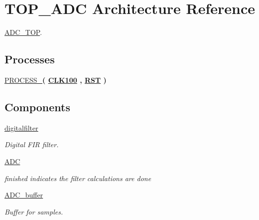 \hypertarget{classADC__TOP_1_1TOP__ADC}{\section{T\-O\-P\-\_\-\-A\-D\-C Architecture Reference}
\label{classADC__TOP_1_1TOP__ADC}
}


\hyperlink{classADC__TOP}{A\-D\-C\-\_\-\-T\-O\-P}.  


\subsection*{Processes}
 \begin{DoxyCompactItemize}
\item 
\hypertarget{classADC__TOP_1_1TOP__ADC_af7530dff761625dab17b84e8c5926692}{\hyperlink{classADC__TOP_1_1TOP__ADC_af7530dff761625dab17b84e8c5926692}{P\-R\-O\-C\-E\-S\-S\-\_}{\bfseries  ( {\bfseries {\bfseries \hyperlink{classADC__TOP_ab1f7becce7cb29d94bb2f2ec187f72a4}{C\-L\-K100}} \textcolor{vhdlchar}{ }\textcolor{vhdlchar}{ }\textcolor{vhdlchar}{ }} , {\bfseries {\bfseries \hyperlink{classADC__TOP_a91cf794d165cc0a740042335a6062940}{R\-S\-T}} \textcolor{vhdlchar}{ }} )}}\label{classADC__TOP_1_1TOP__ADC_af7530dff761625dab17b84e8c5926692}

\end{DoxyCompactItemize}
\subsection*{Components}
 \begin{DoxyCompactItemize}
\item 
\hypertarget{classADC__TOP_1_1TOP__ADC_ae43da35f6da7738b69d6245cc2ca3b49}{\hyperlink{classADC__TOP_1_1TOP__ADC_ae43da35f6da7738b69d6245cc2ca3b49}{digitalfilter}  {\bfseries }  }\label{classADC__TOP_1_1TOP__ADC_ae43da35f6da7738b69d6245cc2ca3b49}

\begin{DoxyCompactList}\small\item\em Digital F\-I\-R filter. \end{DoxyCompactList}\item 
\hypertarget{classADC__TOP_1_1TOP__ADC_ad251174263b28388454816799ffd91ae}{\hyperlink{classADC__TOP_1_1TOP__ADC_ad251174263b28388454816799ffd91ae}{A\-D\-C}  {\bfseries }  }\label{classADC__TOP_1_1TOP__ADC_ad251174263b28388454816799ffd91ae}

\begin{DoxyCompactList}\small\item\em finished indicates the filter calculations are done \end{DoxyCompactList}\item 
\hypertarget{classADC__TOP_1_1TOP__ADC_a76d32257e982d92a96905d3f9b3babc8}{\hyperlink{classADC__TOP_1_1TOP__ADC_a76d32257e982d92a96905d3f9b3babc8}{A\-D\-C\-\_\-buffer}  {\bfseries }  }\label{classADC__TOP_1_1TOP__ADC_a76d32257e982d92a96905d3f9b3babc8}

\begin{DoxyCompactList}\small\item\em Buffer for samples. \end{DoxyCompactList}\end{DoxyCompactItemize}
